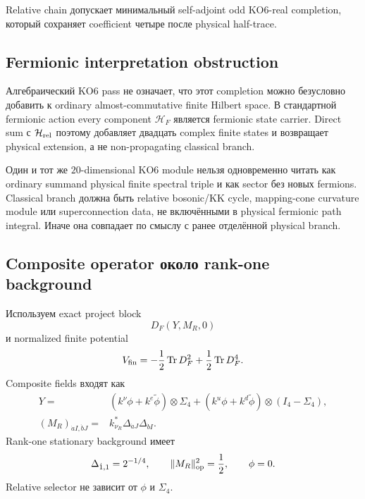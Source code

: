 \begin{proposition}
Relative chain допускает минимальный self-adjoint odd KO6-real completion,
который сохраняет coefficient четыре после physical half-trace.
\end{proposition}

\subsection{Fermionic interpretation obstruction}

Алгебраический KO6 pass не означает, что этот completion можно безусловно
добавить к ordinary almost-commutative finite Hilbert space. В стандартной
fermionic action every component \(\mathcal H_F\) является fermionic state
carrier. Direct sum с \(\mathcal H_{\rm rel}\) поэтому добавляет двадцать
complex finite states и возвращает physical extension, а не
non-propagating classical branch.

\begin{nogocriterion}
Один и тот же \(20\)-dimensional KO6 module нельзя одновременно читать как
ordinary summand physical finite spectral triple и как sector без новых
fermions. Classical branch должна быть relative bosonic/KK cycle,
mapping-cone curvature module или superconnection data, не включёнными в
physical fermionic path integral. Иначе она совпадает по смыслу с ранее
отделённой physical branch.
\end{nogocriterion}

\subsection{Composite operator около rank-one background}

Используем exact project block
\begin{equation}
 D_F(Y,M_R,0)
\end{equation}
и normalized finite potential
\begin{equation}
 V_{\rm fin}=-\frac12\operatorname{Tr} D_F^2+\frac12\operatorname{Tr} D_F^4.
 \label{eq:ps-full-composite-finite-potential}
\end{equation}
Composite fields входят как
\begin{align}
 Y={}&(k^\nu\phi+k^e\widetilde\phi)\otimes\Sigma_4
 +(k^u\phi+k^d\widetilde\phi)\otimes(I_4-\Sigma_4),\\
 (M_R)_{\dot aI,\dot bJ}={}&
 k_{\nu_R}^*\Delta_{\dot aJ}\Delta_{\dot bI}.
\end{align}
Rank-one stationary background имеет
\begin{equation}
 \Delta_{\dot1,1}=2^{-1/4},
 \qquad
 \|M_R\|_{\rm op}^2=\frac12,
 \qquad
 \phi=0.
\end{equation}
Relative selector не зависит от \(\phi\) и \(\Sigma_4\).

